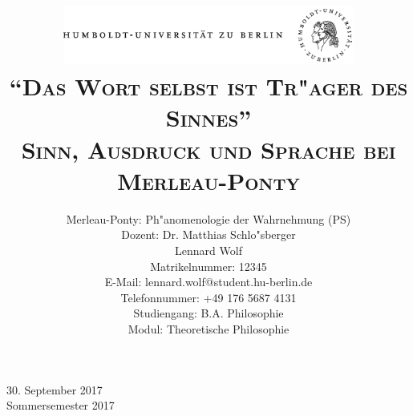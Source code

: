 \documentclass[a4paper, 12pt]{article}
\date{\vspace{-3ex}}
\begin{document}
\title{\vspace{5ex}
	\includegraphics*[bb=0 0 720 200, width=0.72\textwidth]{ErstesSem/images/hu_logo.png}\\
	\vspace{30pt}
	\scshape\LARGE{"`Das Wort selbst ist Tr"ager des Sinnes"'}\\\Large{Sinn, Ausdruck und Sprache bei Merleau-Ponty}\\\vspace{20pt}}
	


\author{Merleau-Ponty: Ph"anomenologie der Wahrnehmung (PS)\\
	\vspace{7pt}
          Dozent: Dr. Matthias Schlo"sberger\\\vspace{4pt}Lennard Wolf\\
        \small{Matrikelnummer: 12345}\\
        \small{E-Mail: lennard.wolf@student.hu-berlin.de}\\
        \small{Telefonnummer: +49 176 5687 4131}\\
        \small{Studiengang: B.A. Philosophie}\\
        \small{Modul: Theoretische Philosophie}}


\maketitle

\vspace{\fill}

\begin{minipage}[]{0.92\textwidth}
    \centering
    \onehalfspacing
    \large   
    30. September 2017\\
    Sommersemester 2017

    \vspace{-20mm} 
\end{minipage}%
\thispagestyle{empty}
\newpage
\setcounter{page}{1}
\end{document}
